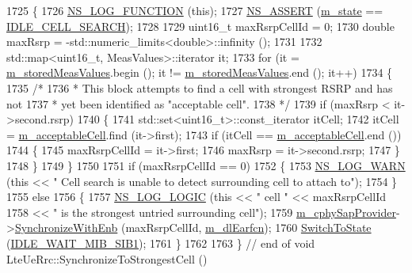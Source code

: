 \begin{DoxyCode}
1725 \{
1726   \hyperlink{log-macros-disabled_8h_a90b90d5bad1f39cb1b64923ea94c0761}{NS\_LOG\_FUNCTION} (\textcolor{keyword}{this});
1727   \hyperlink{assert_8h_a6dccdb0de9b252f60088ce281c49d052}{NS\_ASSERT} (\hyperlink{classns3_1_1LteUeRrc_a81d711739d758a5add38b100086be632}{m\_state} == \hyperlink{classns3_1_1LteUeRrc_a241012c291e75681150c9214e11f6145ada8bc860af077feadad3e3ab250cc942}{IDLE\_CELL\_SEARCH});
1728 
1729   uint16\_t maxRsrpCellId = 0;
1730   \textcolor{keywordtype}{double} maxRsrp = -std::numeric\_limits<double>::infinity ();
1731 
1732   std::map<uint16\_t, MeasValues>::iterator it;
1733   \textcolor{keywordflow}{for} (it = \hyperlink{classns3_1_1LteUeRrc_a93094dcd5c235b2e2a8a299125100a57}{m\_storedMeasValues}.begin (); it != 
      \hyperlink{classns3_1_1LteUeRrc_a93094dcd5c235b2e2a8a299125100a57}{m\_storedMeasValues}.end (); it++)
1734     \{
1735       \textcolor{comment}{/*}
1736 \textcolor{comment}{       * This block attempts to find a cell with strongest RSRP and has not}
1737 \textcolor{comment}{       * yet been identified as "acceptable cell".}
1738 \textcolor{comment}{       */}
1739       \textcolor{keywordflow}{if} (maxRsrp < it->second.rsrp)
1740         \{
1741           std::set<uint16\_t>::const\_iterator itCell;
1742           itCell = \hyperlink{classns3_1_1LteUeRrc_ab2bbe11352c65c6dc52e9809726461ea}{m\_acceptableCell}.find (it->first);
1743           \textcolor{keywordflow}{if} (itCell == \hyperlink{classns3_1_1LteUeRrc_ab2bbe11352c65c6dc52e9809726461ea}{m\_acceptableCell}.end ())
1744             \{
1745               maxRsrpCellId = it->first;
1746               maxRsrp = it->second.rsrp;
1747             \}
1748         \}
1749     \}
1750 
1751   \textcolor{keywordflow}{if} (maxRsrpCellId == 0)
1752     \{
1753       \hyperlink{group__logging_gade7208b4009cdf0e25783cd26766f559}{NS\_LOG\_WARN} (\textcolor{keyword}{this} << \textcolor{stringliteral}{" Cell search is unable to detect surrounding cell to attach to"});
1754     \}
1755   \textcolor{keywordflow}{else}
1756     \{
1757       \hyperlink{group__logging_ga88acd260151caf2db9c0fc84997f45ce}{NS\_LOG\_LOGIC} (\textcolor{keyword}{this} << \textcolor{stringliteral}{" cell "} << maxRsrpCellId
1758                          << \textcolor{stringliteral}{" is the strongest untried surrounding cell"});
1759       \hyperlink{classns3_1_1LteUeRrc_a0441858e31f56c75678afa92b7c7193d}{m\_cphySapProvider}->\hyperlink{classns3_1_1LteUeCphySapProvider_ad906fdd10d4937b67f41f5455dc5cd91}{SynchronizeWithEnb} (maxRsrpCellId, 
      \hyperlink{classns3_1_1LteUeRrc_af8019b7697bea32f260e8dbb7668730f}{m\_dlEarfcn});
1760       \hyperlink{classns3_1_1LteUeRrc_a15f1bea4c3c8d3f9949b234c0cfa12e6}{SwitchToState} (\hyperlink{classns3_1_1LteUeRrc_a241012c291e75681150c9214e11f6145a90439ba7377e977b4e2639b70e48fe2b}{IDLE\_WAIT\_MIB\_SIB1});
1761     \}
1762 
1763 \} \textcolor{comment}{// end of void LteUeRrc::SynchronizeToStrongestCell ()}
\end{DoxyCode}


